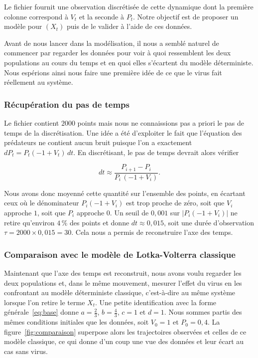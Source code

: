 \documentclass[11pt,a4paper]{article}
\begin{document}
Le fichier fournit une observation discrétisée de cette dynamique dont la première colonne correspond à $V_t$ et la seconde à $P_t$. Notre objectif est de proposer un modèle pour $(X_t)$ puis de le valider à l'aide de ces données.

Avant de nous lancer dans la modélisation, il nous a semblé naturel de commencer par regarder les données pour voir à quoi ressemblent les deux populations au cours du temps et en quoi elles s'écartent du modèle déterministe. Nous espérions ainsi nous faire une première idée de ce que le virus fait réellement au système.

\subsubsection*{Récupération du pas de temps}

Le fichier contient $2000$ points mais nous ne connaissions pas a priori le pas de temps de la discrétisation. Une idée a été d'exploiter le fait que l'équation des prédateurs ne contient aucun bruit puisque l'on a exactement $dP_t = P_t(-1 + V_t)\,dt$. En discrétisant, le pas de temps devrait alors vérifier

\begin{equation}\label{eq:dt}
  dt \approx \frac{P_{i+1} - P_i}{P_i\,(-1 + V_i)}.
\end{equation}

Nous avons donc moyenné cette quantité sur l'ensemble des points, en écartant ceux où le dénominateur $P_i(-1+V_i)$ est trop proche de zéro, soit que $V_i$ approche $1$, soit que $P_i$ approche $0$. Un seuil de $0{,}001$ sur $|P_i(-1+V_i)|$ ne retire qu'environ $4\,\%$ des points et donne $dt \approx 0{,}015$, soit une durée d'observation $\tau = 2000 \times 0{,}015 = 30$. Cela nous a permis de reconstruire l'axe des temps.

\subsubsection*{Comparaison avec le modèle de Lotka-Volterra classique}

Maintenant que l'axe des temps est reconstruit, nous avons voulu regarder les deux populations et, dans le même mouvement, mesurer l'effet du virus en les confrontant au modèle déterministe classique, c'est-à-dire au même système lorsque l'on retire le terme $X_t$. Une petite identification avec la forme générale~\eqref{eq:base} donne $a = \tfrac{2}{3}$, $b = \tfrac{4}{3}$, $c = 1$ et $d = 1$. Nous sommes partis des mêmes conditions initiales que les données, soit $V_0 = 1$ et $P_0 = 0{,}4$. La figure~\ref{fig:comparaison} superpose alors les trajectoires observées et celles de ce modèle classique, ce qui donne d'un coup une vue des données et leur écart au cas sans virus.
\end{document}

